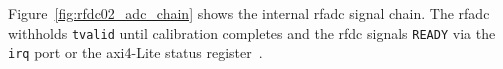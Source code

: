 Figure~\ref{fig:rfdc02_adc_chain} shows the internal \ac{rfadc}
signal chain.
The \ac{rfadc} withholds \texttt{tvalid} until calibration completes
and the \ac{rfdc} signals \texttt{READY} via the \texttt{irq} port
or the \ac{axi}4-Lite status register~\cite{AMD_PG269}.



\FloatBarrier
